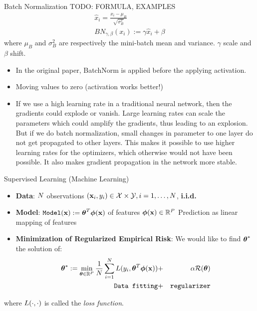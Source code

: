 \documentclass[xcolor=pdftex,dvipsnames,table,mathserif]{beamer}
\begin{document}
\begin{frame}{Batch Normalization}
TODO: FORMULA, EXAMPLES
\begin{eqnarray*}
\hat{x}_i = \frac{x_i-\mu_{B}}{\sqrt{\sigma^2_B}}\\
BN_{\gamma,\beta}(x_i):= \gamma \hat{x}_i + \beta
\end{eqnarray*}
where $\mu_{B}$ and $\sigma^2_B$ are respectively the mini-batch mean and variance. $\gamma$ scale and $\beta$ shift.
\begin{itemize}
\item In the original paper, BatchNorm is applied before the applying activation.
\item Moving values to zero (activation works better!) 
\item If we use a high learning rate in a traditional neural network, then the gradients could explode or vanish. Large learning rates can scale the parameters which could amplify the gradients, thus leading to an explosion. But if we do batch normalization, small changes in parameter to one layer do not get propagated to other layers. This makes it possible to use higher learning rates for the optimizers, which otherwise would not have been possible. It also makes gradient propagation in the network more stable.
\end{itemize}
\end{frame}




\begin{frame}{Supervised Learning (Machine Learning)}
\begin{itemize}
\item \textbf{Data}: $N$ observations $(\mathbf{x}_i,y_i) \in \mathcal{X} \times \mathcal{Y}, i=1,\ldots,N$, \alert{\textbf{i.i.d.}}
\item \textbf{Model}: $\texttt{Model}(\mathbf{x}):=\boldsymbol{\theta}^T\boldsymbol{\phi} (\mathbf{x})$ of features  $\boldsymbol{\phi} (\mathbf{x}) \in \mathbb{R}^P$ \alert{Prediction as linear mapping of features}
\item \textbf{Minimization of Regularized Empirical Risk}: We would like to find $\boldsymbol{\theta}^{*}$ the solution of:
\begin{eqnarray*}
\boldsymbol{\theta}^{*}:=\min_{\boldsymbol{\theta} \in \mathbb{R}^P} \frac{1}{N} \sum_{i=1}^{N} L(y_i,\boldsymbol{\theta}^T\boldsymbol{\phi} (\mathbf{x}))&  + &\alpha \mathcal{R}(\boldsymbol{\theta}) \\
\texttt{Data fitting}& + &\texttt{regularizer}
\end{eqnarray*}
\end{itemize}
where $L(\cdot,\cdot)$ is called the  \emph{loss function}.
\end{frame}
\end{document}
